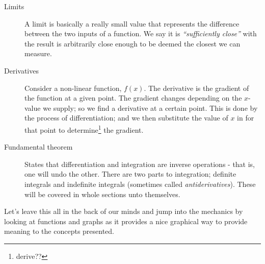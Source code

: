 \begin{description}
  \item[Limits] A limit is basically a really small value that represents the
  difference between the two inputs of a function. We say it is
  \emph{``sufficiently close''} with the result is arbitrarily close enough to
  be deemed the closest we can measure.
  
  \item[Derivatives] Consider a non-linear function, $f(x)$. The derivative is
  the gradient of the function at a given point. The gradient changes depending
  on the $x$-value we supply; so we find a derivative at a certain point. This
  is done by the process of differentiation; and we then substitute the value of
  $x$ in for that point to determine\footnote{derive??} the gradient.
  
  \item[Fundamental theorem] States that differentiation and integration are
  inverse operations - that is, one will undo the other. There are two parts to
  integration; definite integrals and indefinite integrals (sometimes called
  \emph{antiderivatives}). These will be covered in whole sections unto
  themselves.
\end{description}

Let's leave this all in the back of our minds and jump into the mechanics by
looking at functions and graphs as it provides a nice graphical way to provide
meaning to the concepts presented.
